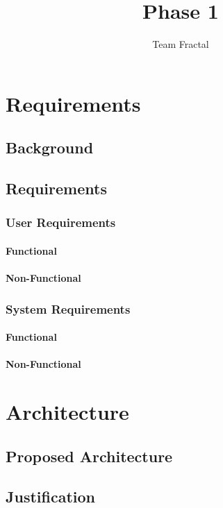 \documentclass{report}   	%
\title{Phase 1}
\author{Team Fractal}
\date{}							%
\begin{document}
\maketitle

\chapter{Requirements}
\section{Background}

\section{Requirements}
\subsection{User Requirements}
\subsubsection{Functional}

\subsubsection{Non-Functional}

\subsection{System Requirements}
\subsubsection{Functional}

\subsubsection{Non-Functional }

\chapter{Architecture}
\section{Proposed Architecture}
\section{Justification}
\end{document}
